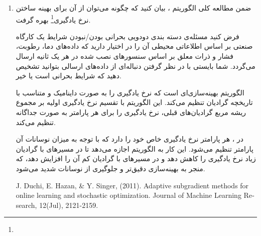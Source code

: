\begin{enumerate}
\begin{qsolve}
نزول گرادیان فقط از مشتق مرتبه اول استفاده می‌کند و به‌روزرسانی وزن‌ها را با توجه به جهت و میزان مشتق انجام می‌دهد. الگوریتم نیوتن به دلیل استفاده از اطلاعات مشتق مرتبه دوم می‌تواند به سرعت به نقطه بهینه نزدیک شود، اما محاسبه و بدست آوردن وارون ماتریس  هزینه‌بر است.

الگوریتم نیوتن برای مسائلی با تعداد پارامترهای کم و توابع ساده، که محاسبه و وارون‌سازی ماتریس   را دشوار نکند، مناسب‌تر است. این الگوریتم در مسائلی که به دقت بالاتر و همگرایی سریع‌تر نیاز داریم، ارجحیت دارد.
\end{qsolve}

\begin{qsolve}
	\begin{latin}
		\begin{thebibliography}{9}
			I. Goodfellow, Y. Bengio \& A. Courville, (2016). Deep Learning. MIT Press, (Chapter on Optimization) (\href{https://www.deeplearningbook.org/}{\textcolor{magenta}{Link}})
			
			J. Nocedal, \& J. S. Wright, (2006). Numerical Optimization. Springer. (Chapters on second-order methods)
		\end{thebibliography} 
	\end{latin}
\end{qsolve}
	
	
	
	
	\item
ضمن مطالعه کلی الگوریتم ، بیان کنید که چگونه می‌توان از آن برای بهینه ساختن نرخ یادگیری\footnote{} بهره گرفت.

فرض کنید مسئله‌ی دسته بندی دودویی بحرانی بودن/نبودن شرایط یک کارگاه صنعتی بر اساس اطلاعاتی محیطی آن را در اختیار دارید که داده‌های دما، رطوبت، فشار و ذرات معلق بر اساس سنسورهای نصب شده در هر یک ثانیه ارسال می‌گردد. شما بایستی با در نظر گرفتن دنباله‌ای از داده‌های ارسالی بتوانید تشخیص دهید که شرایط بحرانی است یا خیر.


\begin{qsolve}
	\lr{AdaGrad (Adaptive Gradient)}
	الگوریتم بهینه‌سازی‌ای است که نرخ یادگیری را به صورت داینامیک و متناسب با تاریخچه گرادیان‌ تنظیم می‌کند. این الگوریتم با تقسیم نرخ یادگیری اولیه بر مجموع ریشه مربع گرادیان‌های قبلی، نرخ یادگیری را برای هر پارامتر به صورت جداگانه تنظیم می‌کند.
	
	در ، هر پارامتر نرخ یادگیری خاص خود را دارد که با توجه به میزان نوسانات آن پارامتر تنظیم می‌شود. این کار به الگوریتم اجازه می‌دهد تا در مسیرهای با گرادیان زیاد نرخ یادگیری را کاهش دهد و در مسیرهای با گرادیان کم آن را افزایش دهد، که منجر به بهینه‌سازی دقیق‌تر و جلوگیری از نوسانات شدید می‌شود.
	\begin{latin}
		\begin{thebibliography}{9}
			\bibitem{ref1}
			J. Duchi, E. Hazan, \& Y. Singer, (2011). Adaptive subgradient methods for online learning and stochastic optimization. Journal of Machine Learning Research, 12(Jul), 2121-2159.
			

\end{thebibliography}
\end{latin}
\end{qsolve}
\end{enumerate}
